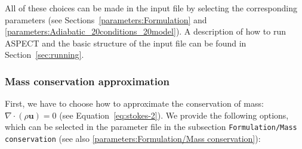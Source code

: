 \documentclass{article}
\newcommand{\aspect}{\textsc{ASPECT}}
\begin{document}
All of these choices can be made in the input file by selecting the corresponding parameters (see Sections~\ref{parameters:Formulation} and \ref{parameters:Adiabatic_20conditions_20model}).
A description of how to run \aspect{} and the basic structure of the input file can be found in
Section~\ref{sec:running}.

\subsubsection{Mass conservation approximation}
\label{sec:mass-conservation-approximation}

First, we have to choose how to approximate the conservation of mass: $\nabla \cdot (\rho \mathbf u) = 0$ (see Equation~\eqref{eq:stokes-2}). 
We provide the following options, which can be selected in the parameter file in the subsection 
\texttt{Formulation/Mass conservation} (see also \ref{parameters:Formulation/Mass conservation}):
\end{document}
